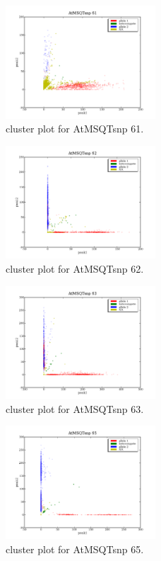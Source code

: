 \begin{figure}[H]
\includegraphics[width=0.5\textwidth]{figures/cluster_plot_AtMSQTsnp_61.png}
\caption{cluster plot for AtMSQTsnp 61.} \label{flAtMSQTsnp61}
\end{figure}

\begin{figure}[H]
\includegraphics[width=0.5\textwidth]{figures/cluster_plot_AtMSQTsnp_62.png}
\caption{cluster plot for AtMSQTsnp 62.} \label{flAtMSQTsnp62}
\end{figure}

\begin{figure}[H]
\includegraphics[width=0.5\textwidth]{figures/cluster_plot_AtMSQTsnp_63.png}
\caption{cluster plot for AtMSQTsnp 63.} \label{flAtMSQTsnp63}
\end{figure}

\begin{figure}[H]
\includegraphics[width=0.5\textwidth]{figures/cluster_plot_AtMSQTsnp_65.png}
\caption{cluster plot for AtMSQTsnp 65.} \label{flAtMSQTsnp65}
\end{figure}

